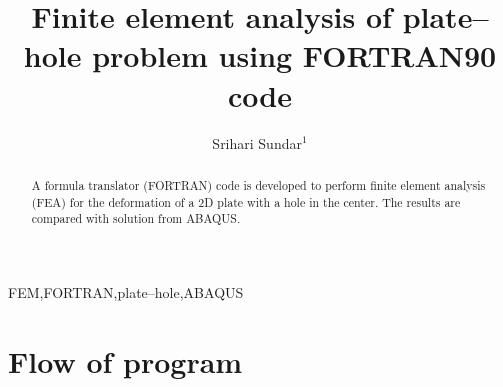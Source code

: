 \documentclass[review]{elsarticle}
\begin{document}
\begin{frontmatter}

\title{Finite element analysis of plate--hole problem using FORTRAN90 code}

\author{Srihari Sundar$^1$}
\address{$^1$Department of Metallurgical and Materials Engineering, Indian Institute of Technology Madras}

\begin{abstract}
A formula translator (FORTRAN) code is developed to perform finite element analysis (FEA) for the deformation of a 2D plate with a hole in the center. The results are compared with solution from ABAQUS. 
\end{abstract}

\begin{keyword}
FEM,FORTRAN,plate--hole,ABAQUS
\end{keyword}

\end{frontmatter}



\section*{Flow of program}
\end{document}
